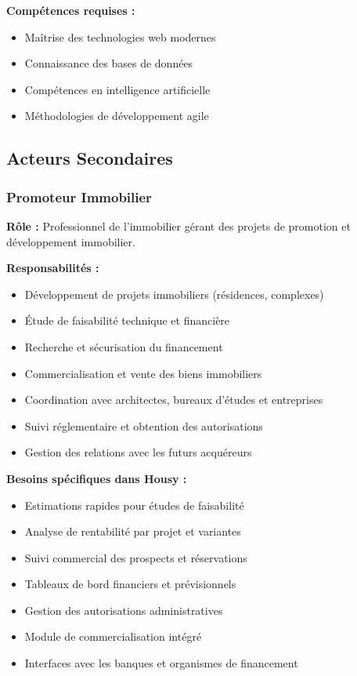 \textbf{Compétences requises :}
\begin{itemize}
    \item Maîtrise des technologies web modernes
    \item Connaissance des bases de données
    \item Compétences en intelligence artificielle
    \item Méthodologies de développement agile
\end{itemize}

\subsection{Acteurs Secondaires}

\subsubsection{Promoteur Immobilier}

\textbf{Rôle :} Professionnel de l'immobilier gérant des projets de promotion et développement immobilier.

\textbf{Responsabilités :}
\begin{itemize}
    \item Développement de projets immobiliers (résidences, complexes)
    \item Étude de faisabilité technique et financière
    \item Recherche et sécurisation du financement
    \item Commercialisation et vente des biens immobiliers
    \item Coordination avec architectes, bureaux d'études et entreprises
    \item Suivi réglementaire et obtention des autorisations
    \item Gestion des relations avec les futurs acquéreurs
\end{itemize}

\textbf{Besoins spécifiques dans Housy :}
\begin{itemize}
    \item Estimations rapides pour études de faisabilité
    \item Analyse de rentabilité par projet et variantes
    \item Suivi commercial des prospects et réservations
    \item Tableaux de bord financiers et prévisionnels
    \item Gestion des autorisations administratives
    \item Module de commercialisation intégré
    \item Interfaces avec les banques et organismes de financement
\end{itemize}

